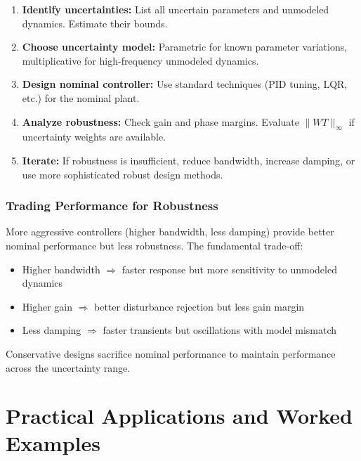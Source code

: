 \begin{enumerate}
    \item \textbf{Identify uncertainties:} List all uncertain parameters and unmodeled dynamics. Estimate their bounds.

    \item \textbf{Choose uncertainty model:} Parametric for known parameter variations, multiplicative for high-frequency unmodeled dynamics.

    \item \textbf{Design nominal controller:} Use standard techniques (PID tuning, LQR, etc.) for the nominal plant.

    \item \textbf{Analyze robustness:} Check gain and phase margins. Evaluate $\|WT\|_{\infty}$ if uncertainty weights are available.

    \item \textbf{Iterate:} If robustness is insufficient, reduce bandwidth, increase damping, or use more sophisticated robust design methods.
\end{enumerate}

\subsubsection{Trading Performance for Robustness}

More aggressive controllers (higher bandwidth, less damping) provide better nominal performance but less robustness. The fundamental trade-off:

\begin{itemize}
    \item Higher bandwidth $\Rightarrow$ faster response but more sensitivity to unmodeled dynamics
    \item Higher gain $\Rightarrow$ better disturbance rejection but less gain margin
    \item Less damping $\Rightarrow$ faster transients but oscillations with model mismatch
\end{itemize}

Conservative designs sacrifice nominal performance to maintain performance across the uncertainty range.

\section{Practical Applications and Worked Examples}
\label{sec:applications}

